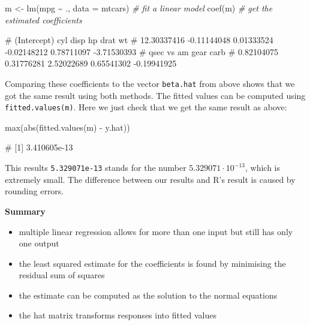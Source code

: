 \documentclass[
  a4paper,
]{article}
\newenvironment{Shaded}{\begin{snugshade}}{\end{snugshade}}
\newcommand{\AttributeTok}[1]{\textcolor[rgb]{0.77,0.63,0.00}{#1}}
\newcommand{\CommentTok}[1]{\textcolor[rgb]{0.56,0.35,0.01}{\textit{#1}}}
\newcommand{\FunctionTok}[1]{\textcolor[rgb]{0.00,0.00,0.00}{#1}}
\newcommand{\NormalTok}[1]{#1}
\newcommand{\OtherTok}[1]{\textcolor[rgb]{0.56,0.35,0.01}{#1}}
\newcommand{\SpecialCharTok}[1]{\textcolor[rgb]{0.00,0.00,0.00}{#1}}
\providecommand{\tightlist}{%
  \setlength{\itemsep}{0pt}\setlength{\parskip}{0pt}}
\theoremstyle{definition}
\theoremstyle{definition}
\theoremstyle{definition}
\theoremstyle{definition}
\theoremstyle{remark}
\begin{document}
\begin{Shaded}
\begin{Highlighting}[]
\NormalTok{m }\OtherTok{\textless{}{-}} \FunctionTok{lm}\NormalTok{(mpg }\SpecialCharTok{\textasciitilde{}}\NormalTok{ ., }\AttributeTok{data =}\NormalTok{ mtcars) }\CommentTok{\# fit a linear model}
\FunctionTok{coef}\NormalTok{(m) }\CommentTok{\# get the estimated coefficients}
\end{Highlighting}
\end{Shaded}

\begin{Shaded}
\begin{Highlighting}[]
\NormalTok{\# (Intercept)         cyl        disp          hp        drat          wt }
\NormalTok{\# 12.30337416 {-}0.11144048  0.01333524 {-}0.02148212  0.78711097 {-}3.71530393 }
\NormalTok{\#        qsec          vs          am        gear        carb }
\NormalTok{\#  0.82104075  0.31776281  2.52022689  0.65541302 {-}0.19941925}
\end{Highlighting}
\end{Shaded}

Comparing these coefficients to the vector \texttt{beta.hat} from above shows
that we got the same result using both methods. The fitted values
can be computed using \texttt{fitted.values(m)}. Here we just check that we get
the same result as above:

\begin{Shaded}
\begin{Highlighting}[]
\FunctionTok{max}\NormalTok{(}\FunctionTok{abs}\NormalTok{(}\FunctionTok{fitted.values}\NormalTok{(m) }\SpecialCharTok{{-}}\NormalTok{ y.hat))}
\end{Highlighting}
\end{Shaded}

\begin{Shaded}
\begin{Highlighting}[]
\NormalTok{\# [1] 3.410605e{-}13}
\end{Highlighting}
\end{Shaded}

This results \texttt{5.329071e-13} stands for the number \(5.329071 \cdot 10^{-13}\),
which is extremely small. The difference between our results and R's result
is caused by rounding errors.

\textbf{Summary}

\begin{itemize}
\tightlist
\item
  multiple linear regression allows for more than one input
  but still has only one output
\item
  the least squared estimate for the coefficients is found
  by minimising the residual sum of squares
\item
  the estimate can be computed as the solution to the normal equations
\item
  the hat matrix transforms responses into fitted values
\end{itemize}
\end{document}

